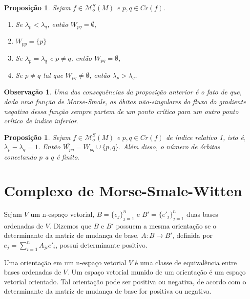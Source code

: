 \documentclass[12pt]{book}
\newtheorem{observacao}[teorema]{Observação}
\newtheorem{proposicao}[teorema]{Proposição}
\newcommand{\funcoesmorsesmale}[1]{\mathcal{M}^{S}_{o}(#1)}
\newcommand{\pontoscriticos}[1]{\textit{Cr}(#1)}
\newcommand{\variedadeconectantepontos}[2]{W_{#1#2}}
\begin{document}
	 \begin{proposicao}
	 	Sejam $f \in \funcoesmorsesmale{M}$ e $p,q \in \pontoscriticos{f}$.
	 	\begin{enumerate}
	 		\item Se $\lambda_{p}<\lambda_{q}$, então $\variedadeconectantepontos{p}{q} = \emptyset$,
	 		
	 		\item $\variedadeconectantepontos{p}{p} = \{p\}$
	 		
	 		\item Se $\lambda_{p} = \lambda_{q}$ e $p\neq q$, então $\variedadeconectantepontos{p}{q} = \emptyset$,
	 		
	 		\item Se $p \neq q$ tal que $\variedadeconectantepontos{p}{q} \neq \emptyset$, então $\lambda_{p}>\lambda_{q}$.
	 	\end{enumerate}
	 \end{proposicao}

	\begin{observacao}
		Uma das consequências da proposição anterior é o fato de que, dada uma função de Morse-Smale, as óbitas não-singulares do fluxo do gradiente negativo dessa função sempre partem de um ponto crítico para um outro ponto crítico de índice inferior.
	\end{observacao}
	
	\begin{proposicao}
		Sejam $f \in \funcoesmorsesmale{M}$ e $p,q \in \pontoscriticos{f}$ de índice relativo 1, isto é, $\lambda_{p} - \lambda_{q} = 1$. Então $\overline{\variedadeconectantepontos{p}{q}} = \variedadeconectantepontos{p}{q} \cup \{p,q\}$. Além disso, o número de órbitas conectando $p$ a $q$ é finito.
	\end{proposicao}

	\section{Complexo de Morse-Smale-Witten}
	
	Sejam $V$ um n-espaço vetorial, $B=\{e_{j}\}_{j=1}^{n}$ e $B'=\{e'_{j}\}_{j=1}^{n}$ duas bases ordenadas de $V$. Dizemos que $B$ e $B'$ possuem a mesma orientação se o determinante da matriz de mudança de base, $A: B \to B'$, definida por $e_{j} = \sum_{i=1}^{n}A_{ji}e'_{i}$, possui determinante positivo. 
	
	Uma orientação em um n-espaço vetorial $V$ é uma classe de equivalência entre bases ordenadas de $V$. Um espaço vetorial munido de um orientação é um espaço vetorial orientado. Tal orientação pode ser positiva ou negativa, de acordo com o determinante da matriz de mudança de base for positiva ou negativa.
	
\end{document}
